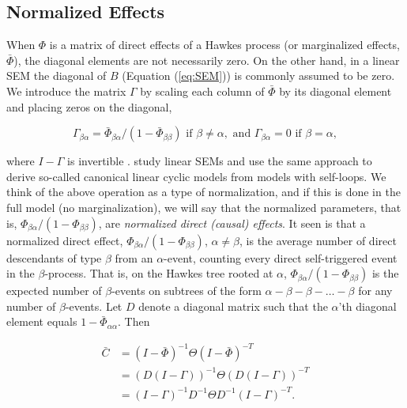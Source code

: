 \documentclass[accepted]{uai2021} %
\begin{document}

\subsection{Normalized Effects}
\label{sssec:normEff}

When $\Phi$ is a matrix of direct effects of a Hawkes process (or marginalized 
effects, $\bar{\Phi}$), the diagonal 
elements are not necessarily zero. On the other hand, in a linear SEM the 
diagonal of $B$ 
(Equation (\ref{eq:SEM})) is commonly assumed to be zero. We introduce 
the matrix $\Gamma$ by scaling each column of $\bar{\Phi}$ by its 
diagonal element and placing zeros on the diagonal,

$$
\Gamma_{\beta\alpha} = 
\bar{\Phi}_{\beta\alpha}/(1-\bar{\Phi}_{\beta\beta})  \text{ 
	if } \beta\neq \alpha, \text{ and } 
\Gamma_{\beta\alpha} 
= 0 \text{ if } \beta= \alpha,
$$

where $I-\Gamma$ is invertible \cite{hyttinen2012}. \cite{hyttinen2012} 
study linear SEMs and use the same approach to derive 
so-called canonical linear 
cyclic models from models with self-loops. We think of the above operation as a 
type of normalization, and if this is done in the full model (no 
marginalization), we 
will say that the normalized parameters, that is, 
${\Phi}_{\beta\alpha}/(1-{\Phi}_{\beta\beta}) $,
are \emph{normalized direct
	(causal) effects}. It seen is that a normalized direct effect, 
${\Phi}_{\beta\alpha}/(1-{\Phi}_{\beta\beta}) $, $\alpha\neq\beta$, is the 
average number of 
direct 
descendants of type 
$\beta$ from an $\alpha$-event, counting every direct self-triggered event in 
the $\beta$-process. 
That is, on the Hawkes tree rooted at $\alpha$, 
${\Phi}_{\beta\alpha}/(1-{\Phi}_{\beta\beta}) $ is 
the expected number of $\beta$-events on subtrees of the form $\alpha - \beta - 
\beta - \ldots - 
\beta$ for any number of $\beta$-events. 
Let $D$ denote a 
diagonal matrix such that the $\alpha$'th diagonal element equals 
$1 - \bar{\Phi}_{\alpha\alpha}$. Then


\begin{align}
\bar{C} & = (I - \bar{\Phi})^{-1}\Theta(I - \bar{\Phi})^{-T} \nonumber  \\
& = (D(I - \Gamma))^{-1}\Theta (D(I - \Gamma))^{-T} \nonumber \\
& = (I - \Gamma)^{-1}D^{-1}\Theta D^{-1}(I - 
\Gamma)^{-T}.
\label{eq:Gtilde}
\end{align}
\end{document}
